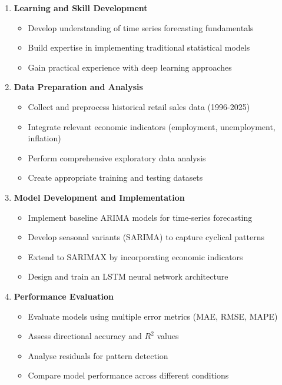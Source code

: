 \documentclass[12pt,a4paper]{report}
\begin{document}
\begin{enumerate}
    \item \textbf{Learning and Skill Development}
    \begin{itemize}
        \item Develop understanding of time series forecasting fundamentals
        \item Build expertise in implementing traditional statistical models
        \item Gain practical experience with deep learning approaches
    \end{itemize}
    
    \item \textbf{Data Preparation and Analysis}
    \begin{itemize}
        \item Collect and preprocess historical retail sales data (1996-2025)
        \item Integrate relevant economic indicators (employment, unemployment, inflation)
        \item Perform comprehensive exploratory data analysis
        \item Create appropriate training and testing datasets
    \end{itemize}
    
    \item \textbf{Model Development and Implementation}
    \begin{itemize}
        \item Implement baseline ARIMA models for time-series forecasting
        \item Develop seasonal variants (SARIMA) to capture cyclical patterns
        \item Extend to SARIMAX by incorporating economic indicators
        \item Design and train an LSTM neural network architecture
    \end{itemize}
    
    \item \textbf{Performance Evaluation}
    \begin{itemize}
        \item Evaluate models using multiple error metrics (MAE, RMSE, MAPE)
        \item Assess directional accuracy and $R^2$ values
        \item Analyse residuals for pattern detection
        \item Compare model performance across different conditions
    \end{itemize}
    

\end{enumerate}
\end{document}

